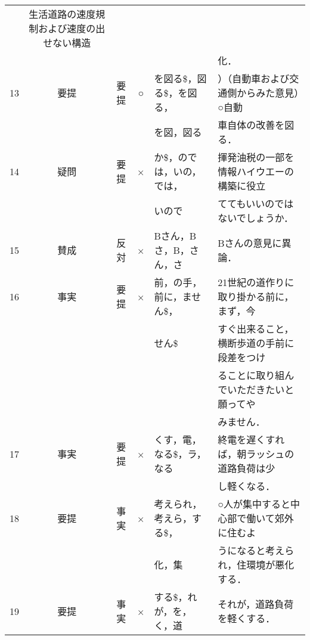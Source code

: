 \begin{table}[t]
\begin{center}
\begin{tabular}{|@{}c@{}|@{~}c@{~}|@{~}c@{~}|@{~}c@{~}|l|l|}
&生活道路の速度規制および速度の出せない構造
\\
&&&
&
&化．
\\ \hline
13 &要提 &要提 &○
&を図る\$，図る\$，を図る，
&）（自動車および交通側からみた意見）○自動
\\
&&&
&を図，図る
&車自体の改善を図る．
\\ \hline
\hline
14 &疑問 &要提 &×
&か\$，のでは，いの，では，
&揮発油税の一部を情報ハイウエーの構築に役立
\\
&&&
&いので
&ててもいいのではないでしょうか．
\\ \hline
15 &賛成 &反対 &×
&Bさん，Bさ，B，さん，さ
&Bさんの意見に異論．
\\ \hline
16 &事実 &要提 &×
&前，の手，前に，ません\$，
&21世紀の道作りに取り掛かる前に，まず，今
\\
&&&
&せん\$
&すぐ出来ること，横断歩道の手前に段差をつけ
\\
&&&
&
&ることに取り組んでいただきたいと願ってや
\\
&&&
&
&みません．
\\ \hline
17 &事実 &要提 &×
&くす，電，なる\$，ラ，なる
&終電を遅くすれば，朝ラッシュの道路負荷は少
\\
&&&
&
&し軽くなる．
\\ \hline
18 &要提 &事実 &×
&考えられ，考えら，する\$，
&○人が集中すると中心部で働いて郊外に住むよ
\\
&&&
&化，集
&うになると考えられ，住環境が悪化する．
\\ \hline
19 &要提 &事実 &×
&する\$，れが，を，く，道
&それが，道路負荷を軽くする．
\\ \hline
\end{tabular}
\end{center}
\end{table}



